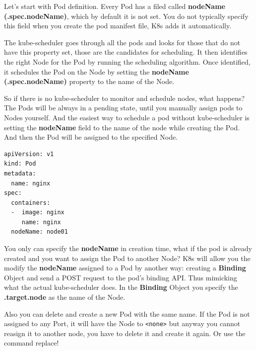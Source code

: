 \documentclass{article}
\newenvironment{blocktemplate}[1]{%
    \tcolorbox[beamer,%
    noparskip,breakable,
    colframe=Blue,%
    colbacklower=LimeGreen!75!LightGreen,%
    title=#1]}%
    {\endtcolorbox}
\newenvironment{codetemplate}[1][]{%
  \mybasecolorbox[#1]
  \itshape
}{%
  \endmybasecolorbox
}
\begin{document}
Let's start with Pod definition. Every Pod has a filed called \textbf{nodeName (.spec.nodeName)}, which by default it is not set. You do not typically specify this field when you create the pod manifest file, K8s adds it automatically. 

The kube-scheduler goes through all the pods and looks for those that do not have this property set, those are the candidates for scheduling. It then identifies the right Node for the Pod by running the scheduling algorithm. Once identified, it schedules the Pod on the Node by setting the \textbf{nodeName (.spec.nodeName)} property to the name of the Node. 

So if there is no kube-scheduler to monitor and schedule nodes, what happens? The Pods will be always in a pending state, until you manually assign pods to Nodes yourself. And the easiest way to schedule a pod without kube-scheduler is setting the \textbf{nodeName} field to the name of the node while creating the Pod. And then the Pod will be assigned to the specified Node. 

\begin{codetemplate}{}
\begin{verbatim}
apiVersion: v1
kind: Pod
metadata:
  name: nginx
spec:
  containers:
  -  image: nginx
     name: nginx
  nodeName: node01
\end{verbatim}
\end{codetemplate}

You only can specify the \textbf{nodeName} in creation time, what if the pod is already created and you want to assign the Pod to another Node? K8s will allow you the modify the \textbf{nodeName} assigned to a Pod by another way: creating a \textbf{Binding} Object and send a POST request to the pod's binding API. Thus mimicking what the actual kube-scheduler does. In the \textbf{Binding} Object you specify the \textbf{.target.node} as the name of the Node.

\begin{blocktemplate}{NOTE:}
Also you can delete and create a new Pod with the same name. If the Pod is not assigned to any Port, it will have the Node to \verb|<none>| but anyway you cannot reasign it to another node, you have to delete it and create it again. Or use the command replace!
\end{blocktemplate}
\end{document}
